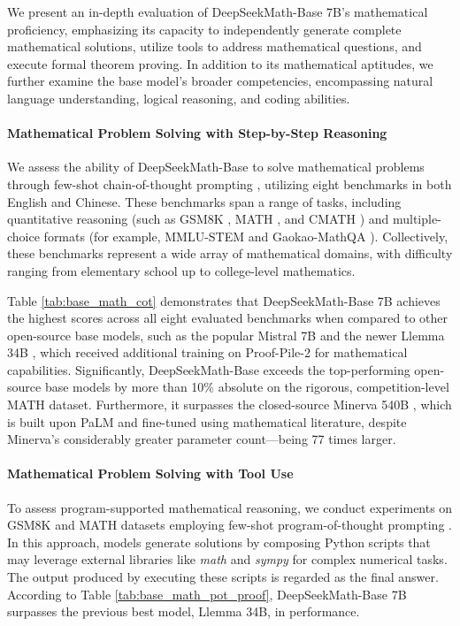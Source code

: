 \begin{itemize}[topsep=0pt]
We present an in-depth evaluation of DeepSeekMath-Base 7B’s mathematical proficiency, emphasizing its capacity to independently generate complete mathematical solutions, utilize tools to address mathematical questions, and execute formal theorem proving. In addition to its mathematical aptitudes, we further examine the base model’s broader competencies, encompassing natural language understanding, logical reasoning, and coding abilities.

\paragraph{Mathematical Problem Solving with Step-by-Step Reasoning}

We assess the ability of DeepSeekMath-Base to solve mathematical problems through few-shot chain-of-thought prompting \citep{cot}, utilizing eight benchmarks in both English and Chinese. These benchmarks span a range of tasks, including quantitative reasoning (such as GSM8K \citep{gsm8k}, MATH \citep{MATH}, and CMATH \citep{wei2023cmath}) and multiple-choice formats (for example, MMLU-STEM \citep{mmlu} and Gaokao-MathQA \citep{agieval}). Collectively, these benchmarks represent a wide array of mathematical domains, with difficulty ranging from elementary school up to college-level mathematics.

Table \ref{tab:base_math_cot} demonstrates that DeepSeekMath-Base 7B achieves the highest scores across all eight evaluated benchmarks when compared to other open-source base models, such as the popular Mistral 7B \citep{mistral} and the newer Llemma 34B \citep{llemma}, which received additional training on Proof-Pile-2 \citep{llemma} for mathematical capabilities. Significantly, DeepSeekMath-Base exceeds the top-performing open-source base models by more than 10\% absolute on the rigorous, competition-level MATH dataset. Furthermore, it surpasses the closed-source Minerva 540B \citep{minerva}, which is built upon PaLM \citep{palm} and fine-tuned using mathematical literature, despite Minerva’s considerably greater parameter count—being 77 times larger.

\paragraph{Mathematical Problem Solving with Tool Use} To assess program-supported mathematical reasoning, we conduct experiments on GSM8K and MATH datasets employing few-shot program-of-thought prompting \citep{pot,pal}. In this approach, models generate solutions by composing Python scripts that may leverage external libraries like \textit{math} and \textit{sympy} for complex numerical tasks. The output produced by executing these scripts is regarded as the final answer. According to Table \ref{tab:base_math_pot_proof}, DeepSeekMath-Base 7B surpasses the previous best model, Llemma 34B, in performance.


\end{itemize}
